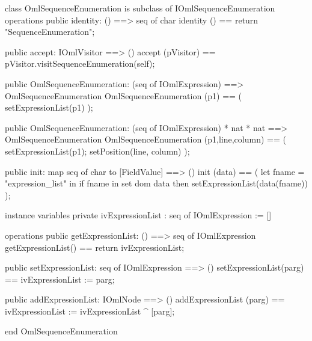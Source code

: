 \begin{vdm_al}
class OmlSequenceEnumeration is subclass of IOmlSequenceEnumeration
operations
  public identity: () ==> seq of char
  identity () == return "SequenceEnumeration";

  public accept: IOmlVisitor ==> ()
  accept (pVisitor) == pVisitor.visitSequenceEnumeration(self);

  public OmlSequenceEnumeration:
    (seq of IOmlExpression) ==> OmlSequenceEnumeration
  OmlSequenceEnumeration (p1) == 
    ( setExpressionList(p1) );

  public OmlSequenceEnumeration:
    (seq of IOmlExpression) *
    nat *
    nat ==> OmlSequenceEnumeration
  OmlSequenceEnumeration (p1,line,column) == 
    ( setExpressionList(p1);
      setPosition(line, column) );

  public init: map seq of char to [FieldValue] ==> ()
  init (data) ==
    ( let fname = "expression_list" in
        if fname in set dom data
        then setExpressionList(data(fname)) );

instance variables
  private ivExpressionList : seq of IOmlExpression := []

operations
  public getExpressionList: () ==> seq of IOmlExpression
  getExpressionList() == return ivExpressionList;

  public setExpressionList: seq of IOmlExpression ==> ()
  setExpressionList(parg) == ivExpressionList := parg;

  public addExpressionList: IOmlNode ==> ()
  addExpressionList (parg) == ivExpressionList := ivExpressionList ^ [parg];

end OmlSequenceEnumeration
\end{vdm_al}

